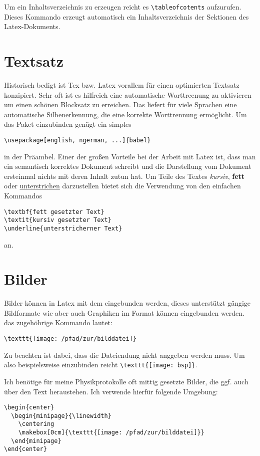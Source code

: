 Um ein Inhaltsverzeichnis zu erzeugen reicht es \verb+\tableofcotents+ aufzurufen. Dieses Kommando erzeugt
automatisch ein Inhaltsverzeichnis der Sektionen des Latex-Dokuments.

\section{Textsatz}
Historisch bedigt ist Tex bzw. Latex vorallem für einen optimierten Textsatz konzipiert. Sehr oft ist es hilfreich
eine automatische Worttreenung zu aktivieren um einen schönen Blocksatz zu erreichen. Das 
liefert für viele Sprachen eine automatische Silbenerkennung, die eine korrekte Worttrennung ermöglicht. Um
das Paket einzubinden genügt ein simples
\begin{verbatim}
\usepackage[english, ngerman, ...]{babel} 
\end{verbatim}
in der Präambel. Einer der großen Vorteile bei der Arbeit mit Latex ist, dass man ein semantisch korrektes
Dokument schreibt und die Darstellung vom Dokument ersteinmal nichts mit deren Inhalt zutun hat. Um Teile
des Textes \textit{kursiv}, \textbf{fett} oder \underline{unterstrichen} darzustellen bietet sich die Verwendung 
von den einfachen Kommandos 
\begin{verbatim}
\textbf{fett gesetzter Text}
\textit{kursiv gesetzter Text}
\underline{unterstricherner Text}
\end{verbatim}
an. 

\section{Bilder}
Bilder können in Latex mit dem  eingebunden werden, dieses unterstützt gängige
Bildformate wie  aber auch Graphiken im  Format können eingebunden werden.
das zugehöhrige Kommando lautet:
\begin{verbatim}
\texttt{[image: /pfad/zur/bilddatei]}
\end{verbatim}
Zu beachten ist dabei, dass die Dateiendung nicht anggeben werden muss. Um also beispielsweise 
einzubinden reicht \verb+\texttt{[image: bsp]}+.

Ich benötige für meine Physikprotokolle oft mittig gesetzte Bilder, die ggf. auch über den Text heraustehen.
Ich verwende hierfür folgende Umgebung:
\begin{verbatim}
\begin{center}
  \begin{minipage}{\linewidth}
    \centering
    \makebox[0cm]{\texttt{[image: /pfad/zur/bilddatei]}}
  \end{minipage}
\end{center}
\end{verbatim}

